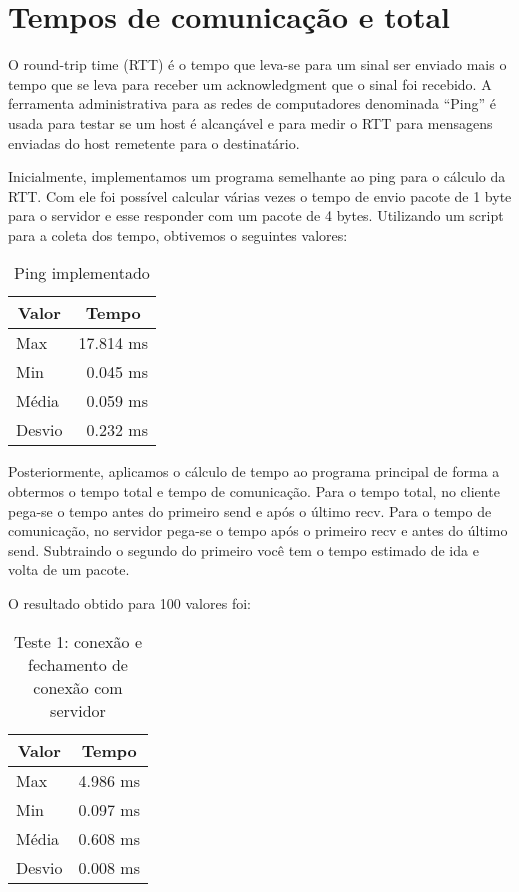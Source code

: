 \documentclass[10pt,a4paper]{article}
\begin{document}
\section{Tempos de comunicação e total}
O round-trip time (RTT) é o tempo que leva-se para um sinal ser
enviado mais o tempo que se leva para receber um acknowledgment que o
sinal foi recebido. A ferramenta administrativa para as redes de
computadores denominada ``Ping'' é usada para testar se um host é alcançável e para
medir o RTT para mensagens enviadas do host remetente para o
destinatário.

Inicialmente, implementamos um programa semelhante ao ping para o
cálculo da RTT. Com ele foi possível calcular várias vezes o tempo de envio pacote
de 1 byte para o servidor e esse responder com um pacote de 4
bytes. Utilizando um script para a coleta dos tempo, obtivemos o
seguintes valores:

\begin{table}[h!]
\caption{Ping implementado}
\begin{center}
  \begin{tabular}{lr}
    \multicolumn{1}{c}{Valor} & \multicolumn{1}{c}{Tempo}\\
    \hline
    Max & 17.814 ms\\
    Min & 0.045 ms\\
    Média & 0.059 ms \\
    Desvio & 0.232 ms
  \end{tabular}

\end{center}
\end{table}

Posteriormente, aplicamos o cálculo de tempo ao programa principal de
forma a obtermos o tempo total e tempo de comunicação.
Para o tempo total, no cliente pega-se  o tempo antes do primeiro send e após o último recv.
Para o tempo de comunicação, no servidor pega-se o tempo após o
primeiro recv e antes do último send.
Subtraindo o segundo do primeiro você tem o tempo estimado de ida e
volta de um pacote. 

O resultado obtido para 100 valores foi:

\begin{table}[h!]
\caption{Teste 1: conexão e fechamento de conexão com servidor}
\begin{center}
  \begin{tabular}{lr}
    \multicolumn{1}{c}{Valor} & \multicolumn{1}{c}{Tempo}\\
    \hline
    Max & 4.986 ms\\
    Min & 0.097 ms\\
    Média & 0.608 ms \\
    Desvio & 0.008 ms
  \end{tabular}

\end{center}
\end{table}
\end{document}
